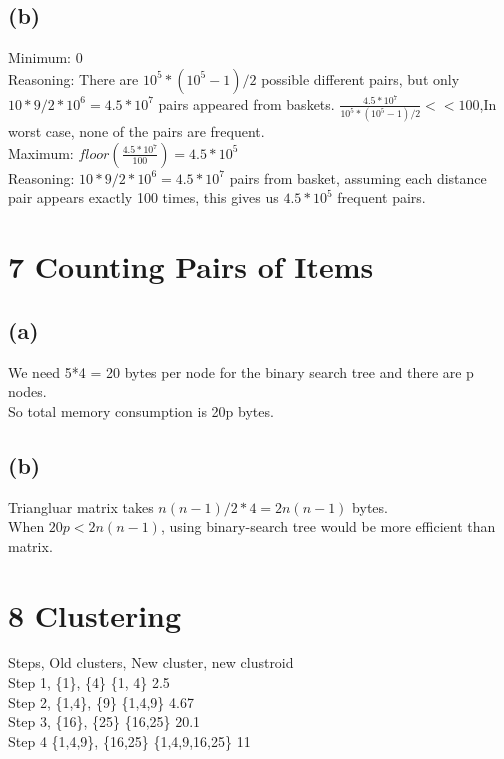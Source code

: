 \documentclass{article}
\begin{document}
\subsection{(b)}
Minimum: 0 \\
Reasoning: There are $10^5 * (10^5-1) / 2$ possible different pairs, but only $10*9/2*10^6 = 4.5 * 10^7$ pairs appeared from baskets. $\frac{4.5 * 10^7}{10^5 * (10^5-1) / 2} << 100 $,In worst case, none of the pairs are frequent. \\
Maximum: $floor(\frac{4.5 * 10^7}{100}) = 4.5 * 10^5 $ \\
Reasoning: $10*9/2*10^6 = 4.5 * 10^7$ pairs from basket, assuming each distance pair appears exactly 100 times, this gives us $4.5 * 10^5$ frequent pairs.

\section{7 Counting Pairs of Items}
\subsection{(a)}
We need 5*4 = 20 bytes per node for the binary search tree and there are p nodes. \\
So total memory consumption is 20p bytes.

\subsection{(b)}
Triangluar matrix takes $n(n-1)/2*4 = 2n(n-1)$ bytes. \\
When $20p <   2n(n-1)$, using binary-search tree would be more efficient than matrix.

\section{8 Clustering}
Steps, \hspace{10 mm}   Old clusters,     \hspace{10 mm} New cluster, \hspace{10 mm}  new clustroid \\
Step 1,  \hspace{10 mm} \{1\}, \{4\}  \hspace{10 mm} \{1, 4\}         \hspace{10 mm}      2.5 \\
Step 2,  \hspace{10 mm} \{1,4\}, \{9\}  \hspace{10 mm} \{1,4,9\}      \hspace{10 mm}       4.67 \\
Step 3,  \hspace{10 mm} \{16\}, \{25\}  \hspace{10 mm} \{16,25\}      \hspace{10 mm}      20.1\\
Step 4   \hspace{10 mm} \{1,4,9\}, \{16,25\} \hspace{10 mm} \{1,4,9,16,25\}   \hspace{10 mm}11 \\
\end{document}
